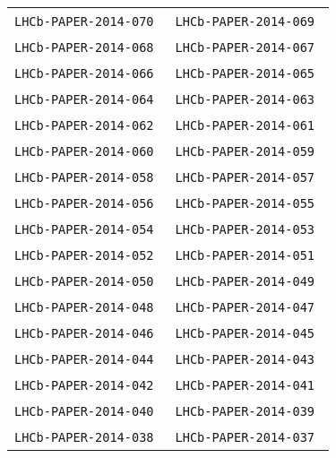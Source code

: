 \begin{center}
\begin{longtable}{ll}
\midrule
\texttt{LHCb-PAPER-2014-070}~\cite{LHCb-PAPER-2014-070} &
\texttt{LHCb-PAPER-2014-069}~\cite{LHCb-PAPER-2014-069} \\
\texttt{LHCb-PAPER-2014-068}~\cite{LHCb-PAPER-2014-068} &
\texttt{LHCb-PAPER-2014-067}~\cite{LHCb-PAPER-2014-067} \\
\texttt{LHCb-PAPER-2014-066}~\cite{LHCb-PAPER-2014-066} &
\texttt{LHCb-PAPER-2014-065}~\cite{LHCb-PAPER-2014-065} \\
\texttt{LHCb-PAPER-2014-064}~\cite{LHCb-PAPER-2014-064} &
\texttt{LHCb-PAPER-2014-063}~\cite{LHCb-PAPER-2014-063} \\
\texttt{LHCb-PAPER-2014-062}~\cite{LHCb-PAPER-2014-062} &
\texttt{LHCb-PAPER-2014-061}~\cite{LHCb-PAPER-2014-061} \\
\texttt{LHCb-PAPER-2014-060}~\cite{LHCb-PAPER-2014-060} &
\texttt{LHCb-PAPER-2014-059}~\cite{LHCb-PAPER-2014-059} \\
\texttt{LHCb-PAPER-2014-058}~\cite{LHCb-PAPER-2014-058} &
\texttt{LHCb-PAPER-2014-057}~\cite{LHCb-PAPER-2014-057} \\
\texttt{LHCb-PAPER-2014-056}~\cite{LHCb-PAPER-2014-056} &
\texttt{LHCb-PAPER-2014-055}~\cite{LHCb-PAPER-2014-055} \\
\texttt{LHCb-PAPER-2014-054}~\cite{LHCb-PAPER-2014-054} &
\texttt{LHCb-PAPER-2014-053}~\cite{LHCb-PAPER-2014-053} \\
\texttt{LHCb-PAPER-2014-052}~\cite{LHCb-PAPER-2014-052} &
\texttt{LHCb-PAPER-2014-051}~\cite{LHCb-PAPER-2014-051} \\
\texttt{LHCb-PAPER-2014-050}~\cite{LHCb-PAPER-2014-050} &
\texttt{LHCb-PAPER-2014-049}~\cite{LHCb-PAPER-2014-049} \\
\texttt{LHCb-PAPER-2014-048}~\cite{LHCb-PAPER-2014-048} &
\texttt{LHCb-PAPER-2014-047}~\cite{LHCb-PAPER-2014-047} \\
\texttt{LHCb-PAPER-2014-046}~\cite{LHCb-PAPER-2014-046} &
\texttt{LHCb-PAPER-2014-045}~\cite{LHCb-PAPER-2014-045} \\
\texttt{LHCb-PAPER-2014-044}~\cite{LHCb-PAPER-2014-044} &
\texttt{LHCb-PAPER-2014-043}~\cite{LHCb-PAPER-2014-043} \\
\texttt{LHCb-PAPER-2014-042}~\cite{LHCb-PAPER-2014-042} &
\texttt{LHCb-PAPER-2014-041}~\cite{LHCb-PAPER-2014-041} \\
\texttt{LHCb-PAPER-2014-040}~\cite{LHCb-PAPER-2014-040} &
\texttt{LHCb-PAPER-2014-039}~\cite{LHCb-PAPER-2014-039} \\
\texttt{LHCb-PAPER-2014-038}~\cite{LHCb-PAPER-2014-038} &
\texttt{LHCb-PAPER-2014-037}~\cite{LHCb-PAPER-2014-037} \\

\end{longtable}
\end{center}
